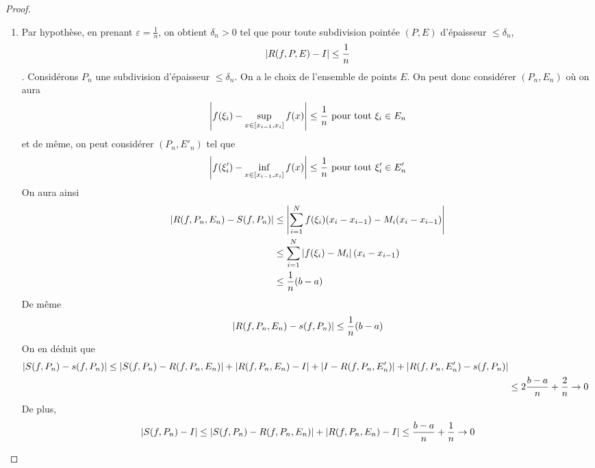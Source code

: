 \begin{proof}
\begin{enumerate}
    En procédant de la même manière avec $S(f,P_n)$, on obtient $S(f,P_n) \ge R(f,P,E) - 2\varepsilon$.
    On a alors \begin{align*}
        -3\varepsilon&\le R(f,P,E)-s(f,P_n)-\varepsilon\\&\le R(f,P,E) - S(f,P_n) \\
        &\le R(f,P,E) + I \\
        &\le R(f,P,E) - s(f,P_n)
    \end{align*}
    Nous avons donc $|R(f,P,E) - I| \le 3\varepsilon$
    \item Par hypothèse, en prenant $\varepsilon = \frac1n$, on obtient $\delta_n>0$ tel que pour toute subdivision pointée $(P,E)$ d'épaisseur $\le\delta_n$, $$\left| R(f,P,E)-I \right|\le\frac 1 n$$. Considérons $P_n$ une subdivision d'épaisseur $\le\delta_n$. On a le choix de l'ensemble de points $E$. On peut donc considérer $(P_n,E_n)$ où on aura $$\left| f(\xi_i)-\sup_{x\in[x_{i-1},x_i]}f(x) \right|\le \frac 1n\text{ pour tout $\xi_i\in E_n$}$$ et de même, on peut considérer $(P_n,E'_n)$ tel que $$\left| f(\xi_i')-\inf_{x\in[x_{i-1},x_i]}f(x) \right|\le\frac 1n \text{ pour tout $\xi_i'\in E'_n$}$$
    On aura ainsi
    \begin{align*}
        \left| R(f,P_n,E_n)-S(f,P_n) \right|&\le \left| \sum_{i=1}^Nf(\xi_i)(x_i-x_{i-1})-M_i(x_i-x_{i-1}) \right|\\
        &\le \sum_{i=1}^N\left| f(\xi_i)-M_i \right|(x_i-x_{i-1})\\
        &\le\frac 1n(b-a)
    \end{align*}
    De même $$ \left| R(f,P_n,E_n)-s(f,P_n) \right|\le \frac 1n(b-a)$$
    On en déduit que \begin{align*}
        \left| S(f,P_n)-s(f,P_n) \right|\le \left| S(f,P_n)-R(f,P_n,E_n) \right| + \left| R(f,P_n,E_n)-I \right| + \left| I-R(f,P_n,E_n') \right| + \left| R(f,P_n,E_n') - s(f,P_n) \right|\\
        &\le 2\frac{b-a}{n} + \frac{2}{n}\to 0
    \end{align*}
    De plus, $$\left| S(f,P_n)-I \right|\le \left| S(f,P_n)-R(f,P_n,E_n) \right| + \left| R(f,P_n,E_n)-I \right|\le \frac{b-a}{n} + \frac{1}{n}\to 0$$
\end{enumerate} 
\end{proof}
